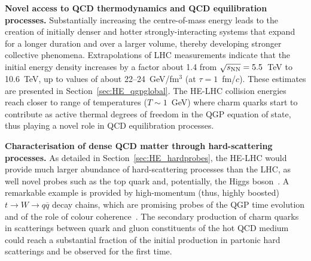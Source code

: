 \documentclass[../report.tex]{subfiles}
\begin{document}
\noindent
	{\bf Novel access to QCD thermodynamics and QCD equilibration processes.}
	Substantially increasing the centre-of-mass energy leads to the creation of initially denser and hotter strongly-interacting systems that expand for a longer duration and over a larger volume, thereby
	developing stronger collective phenomena. 
Extrapolations of LHC measurements indicate that the initial energy density increases by a factor about 1.4 from $\sqrt{s_{\rm NN}} = 5.5$~TeV to 10.6~TeV, up to values of about 22--24~GeV/fm$^3$ (at $\tau=1$~fm/$c$).
These estimates are presented in Section~\ref{sec:HE_qgpglobal}.
The HE-LHC collision energies reach closer to range of temperatures ($T\sim 1$~GeV) where charm quarks start to contribute as active thermal degrees of freedom in the QGP equation of state, thus playing a novel role in QCD equilibration processes. 

\noindent
	 {\bf Characterisation of dense QCD matter through hard-scattering processes.}
As detailed in Section~\ref{sec:HE_hardprobes}, the HE-LHC would provide much larger abundance of hard-scattering processes than the LHC, as well novel probes such as the top quark and, potentially, the Higgs boson~\cite{Apolinario:2017sob,dEnterria:2015mgr,dEnterria:2017jyt}. 
A remarkable example is provided by high-momentum (thus, highly boosted) $t \to W \to q\overline q$ decay chains, which are promising probes of the QGP time evolution and of the role of colour coherence~\cite{Apolinario:2017sob}. 
The secondary production of charm quarks in scatterings between quark and gluon constituents of the hot QCD medium could reach a substantial fraction of the initial production in partonic hard scatterings and be observed for the first time. 
\end{document}
